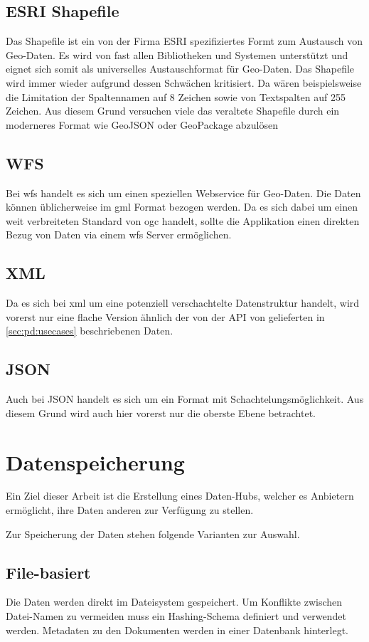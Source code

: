 \subsection{ESRI Shapefile}
Das Shapefile ist ein von der Firma ESRI spezifiziertes Formt zum Austausch von Geo-Daten. Es wird von fast allen Bibliotheken und Systemen unterstützt und eignet sich somit als universelles Austauschformat für Geo-Daten. Das Shapefile wird immer wieder aufgrund dessen Schwächen kritisiert. Da wären beispielsweise die Limitation der Spaltennamen auf 8 Zeichen sowie von Textspalten auf 255 Zeichen. Aus diesem Grund versuchen viele das veraltete Shapefile durch ein moderneres Format wie GeoJSON oder GeoPackage abzulösen\cite{sfkeller}

\subsection{WFS}
Bei \gls{wfs} handelt es sich um einen speziellen Webservice für Geo-Daten. Die Daten können üblicherweise im \gls{gml} Format bezogen werden. Da es sich dabei um einen weit verbreiteten Standard von \gls{ogc} handelt, sollte die Applikation einen direkten Bezug von Daten via einem \acs{wfs} Server ermöglichen.

\subsection{XML}
Da es sich bei \gls{xml} um eine potenziell verschachtelte Datenstruktur handelt, wird vorerst nur eine flache Version ähnlich der von der API von  gelieferten in \cref{sec:pd:usecases} beschriebenen Daten. 

\subsection{JSON}
Auch bei JSON handelt es sich um ein Format mit Schachtelungsmöglichkeit. Aus diesem Grund wird auch hier vorerst nur die oberste Ebene betrachtet.


\section{Datenspeicherung}
Ein Ziel dieser Arbeit ist die Erstellung eines Daten-Hubs, welcher es Anbietern ermöglicht, ihre Daten anderen zur Verfügung zu stellen. 

Zur Speicherung der Daten stehen folgende Varianten zur Auswahl.

\subsection{File-basiert}
Die Daten werden direkt im Dateisystem gespeichert. Um Konflikte zwischen Datei-Namen zu vermeiden muss ein Hashing-Schema definiert und verwendet werden. Metadaten zu den Dokumenten werden in einer Datenbank hinterlegt.

